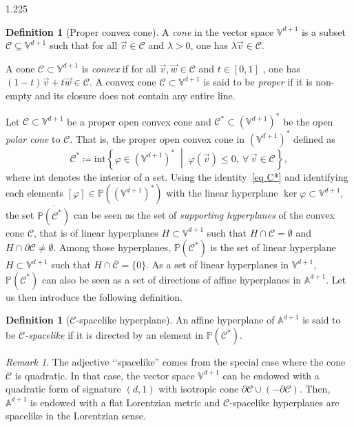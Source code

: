 \documentclass[reqno, a4paper]{amsart}
\numberwithin{equation}{section}
\numberwithin{figure}{section}
\theoremstyle{definition}
\newtheorem{definition}[theorem]{Definition}
\theoremstyle{remark}
\newtheorem{remark}[theorem]{Remark}
\newcommand{\V}{\mathbb{V}} %
\newcommand{\A}{\mathbb{A}} %
\renewcommand{\P}{\mathbb{P}} %
\newcommand{\C}{\mathcal{C}} %
\newcommand{\st}{\; \middle\vert \;} %
\begin{document}
\begin{spacing}{1.225}
\begin{definition}[Proper convex cone]
A \emph{cone} in the vector space $\V^{d+1}$ is a subset $\C \subseteq \V^{d+1}$ such that for all $\vec{v} \in \C$ and $\lambda>0$, one has $\lambda\vec{v} \in \C$.

A cone $\C \subset \V^{d+1}$ is \emph{convex} if for all $\vec{v},\vec{w} \in \C$ and $t \in [0,1]$ , one has $ (1-t)\vec{v}+t\vec{w} \in \C$. A convex cone $\C \subset \V^{d+1}$ is said to be \emph{proper} if it is non-empty and its closure does not contain any entire line.   
\end{definition} 

Let $\C \subset \V^{d+1}$ be a proper open convex cone and $\C^* \subset (\V^{d+1})^*$ be the open \emph{polar cone} to $\C$. That is, the proper open convex cone in $(\V^{d+1})^*$ defined as 
\begin{equation}
\label{eq C*}
\C^* \coloneqq \mathrm{int} \left\lbrace \varphi \in (\V^{d+1})^* \st \varphi(\vec{v}) \leq 0, \ \forall \, \vec{v} \in \C\right\rbrace,
\end{equation}
where $\mathrm{int}$ denotes the interior of a set. Using the identity~\eqref{eq C*} and identifying each elements $[\varphi] \in \P((\V^{d+1})^*)$ with the linear hyperplane $\ker \varphi \subset \V^{d+1}$, the set $\overline{\P(\C^*)} $ can be seen as the set of \emph{supporting hyperplanes} of the convex cone $\C$, that is of linear hyperplanes $H \subset \V^{d+1}$ such that $H\cap \C = \emptyset $ and $H\cap \partial\C \neq \emptyset$. Among those hyperplanes, $\P(\C^*)$ is the set of linear hyperplane $H \subset \V^{d+1}$ such that $H\cap \overline{\C} = \{0\} $. As a set of linear hyperplanes in $\V^{d+1}$, $\P(\C^*)$ can also be seen as a set of directions of affine hyperplanes in $\A^{d+1}$. Let us then introduce the following definition.

\begin{definition}[$\C$-spacelike hyperplane]
\label{def C-spacelike hyperplane}
An affine hyperplane of $\A^{d+1}$ is said to be \emph{$\C$-spacelike} if it is directed by an element in $\P(\C^*)$.
\end{definition} 

\begin{remark}
The adjective ‘‘spacelike'' comes from the special case where the cone $\C$ is quadratic. In that case, the vector space $\V^{d+1}$ can be endowed with a quadratic form of signature $(d,1)$ with isotropic cone $\partial \C \cup (- \partial \C)$. Then, $\A^{d+1}$ is endowed with a flat Lorentzian metric and $\C$-spacelike hyperplanes are spacelike in the Lorentzian sense.
\end{remark}


\end{spacing}
\end{document}
